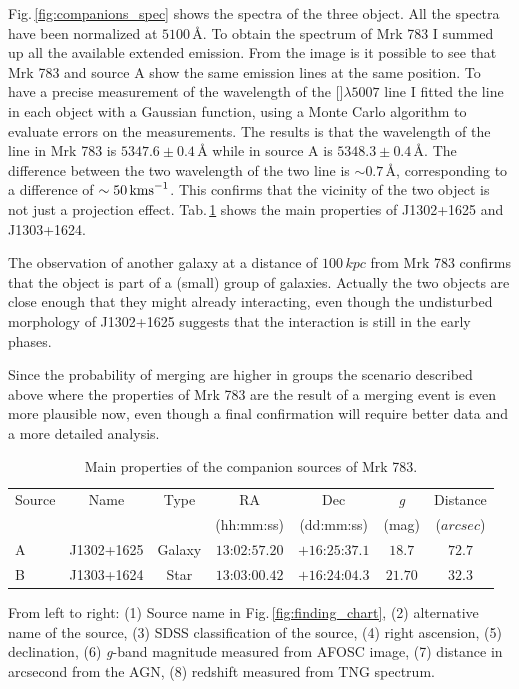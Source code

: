\documentclass[../thesis.tex]{subfiles}
\begin{document}
Fig.\,\ref{fig:companions_spec} shows the spectra of the three object.
All the spectra have been normalized at $5100\,\si{\angstrom}$.
To obtain the spectrum of Mrk 783 I summed up all the available extended emission.
From the image is it possible to see that Mrk 783 and source A show the same emission lines at the same position. 
To have a precise measurement of the wavelength of the []$\lambda5007$ line I fitted the line in each object with a Gaussian function, using a Monte Carlo algorithm to evaluate errors on the measurements.
The results is that the wavelength of the line in Mrk 783  is $5347.6\pm0.4\,\si{\angstrom}$ while in source A is $5348.3\pm0.4\,\si{\angstrom}$.
The difference between the two wavelength of the two line is $\sim 0.7\,\si{\angstrom}$, corresponding to a difference of $\sim 50\,\si{\kms}$.
This confirms that the vicinity of the two object is not just a projection effect.
Tab.\,\ref{tab:companions} shows the main properties of J1302+1625 and J1303+1624.

The observation of another galaxy at a distance of $100\,\si{kpc}$ from Mrk 783 confirms that the object is part of a (small) group of galaxies.
Actually the two objects are close enough that they might already interacting, even though the undisturbed morphology of J1302+1625 suggests that the interaction is still in the early phases.

Since the probability of merging are higher in groups \citep{Kampczyk13} the scenario described above where the properties of Mrk 783 are the result of a merging event is even more plausible now, even though a final confirmation will require better data and a more detailed analysis.

\begin{table}
    \centering
    \caption{Main properties of the companion sources of Mrk 783.}
    \label{tab:companions}
    \begin{threeparttable}
    \begin{tabular}{lcccccc}
    \hline
    \hline
    Source& Name & Type& RA & Dec & \emph{g}& Distance\\
          &      &     & (hh:mm:ss)&(dd:mm:ss)& (mag) &($\si{arcsec}$)\\
    \hline
    A &J1302+1625&Galaxy &$13$:$02$:$57.20$&$+16$:$25$:$37.1$&$18.7$&$72.7$\\
    B &J1303+1624&Star &$13$:$03$:$00.42$&$+16$:$24$:$04.3$&$21.70$&$32.3$\\
    \hline
    \end{tabular}
    \begin{tablenotes}
    \item From left to right: (1) Source name in Fig.\,\ref{fig:finding_chart}, (2) alternative name of the source, (3) SDSS classification of the source, (4) right ascension, (5) declination, (6) \emph{g}-band magnitude measured from AFOSC image, (7) distance in arcsecond from the AGN, (8) redshift measured from TNG spectrum.
    \end{tablenotes}
    \end{threeparttable}
\end{table}
\end{document}
